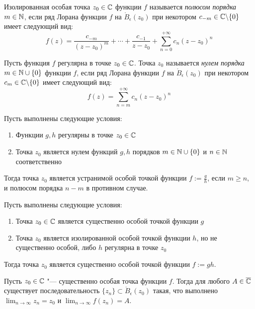 \begin{definition}
	Изолированная особая точка $z_0 \in \mathbb{C}$ функции $f$ называется \textit{полюсом порядка $m \in \mathbb{N}$}, если ряд Лорана функции $f$ на $\mathring B_\epsilon(z_0)$ при некотором $c_{-m} \in \mathbb{C} \backslash \{0\}$ имеет следующий вид:
	\[f(z) = \frac{c_{-m}}{(z-z_0)^m} + \dotsb + \frac{c_{-1}}{z-z_0} + \sum_{n = 0}^{+\infty}c_n(z - z_0)^n\]
\end{definition}

\begin{definition}
	Пусть функция $f$ регулярна в точке $z_0 \in \mathbb{C}$. Точка $z_0$ называется \textit{нулем порядка $m \in \mathbb{N} \cup \{0\}$} функции $f$, если ряд Лорана функции $f$ на $\mathring B_\epsilon(z_0)$ при некотором $c_{m} \in \mathbb{C} \backslash \{0\}$ имеет следующий вид:
	\[f(z) = \sum_{n = m}^{+\infty}c_n(z - z_0)^n\]
\end{definition}

\begin{proposition}
	Пусть выполнены следующие условия:
	\begin{enumerate}
		\item Функции $g, h$ регулярны в точке $z_0 \in \mathbb{C}$
		\item Точка $z_0$ является нулем функций $g, h$ порядков $m \in \mathbb{N} \cup \{0\}$ и $n \in \mathbb{N}$ соответственно
	\end{enumerate}
	
	Тогда точка $z_0$ является устранимой особой точкой функции $f := \frac{g}{h}$, если $m \ge n$, и полюсом порядка $n - m$ в противном случае.
\end{proposition}

\begin{proposition}
	Пусть выполнены следующие условия:
	\begin{enumerate}
		\item Точка $z_0 \in \mathbb{C}$ является существенно особой точкой функции $g$
		\item Точка $z_0$ является изолированной особой точкой функции $h$, но не существенно особой, либо $h$ регулярна в точке $z_0$ 
	\end{enumerate}
	
	Тогда точка $z_0$ является существенно особой точкой функции $f := gh$.
\end{proposition}

\begin{theorem}[Сохоцкого]
	Пусть $z_0 \in \mathbb{C}$ "--- существенно особая точка функции $f$. Тогда для любого $A \in \overline{\mathbb{C}}$ существует последовательность $\{z_n\} \subset \mathring B_\epsilon(z_0)$ такая, что выполнено $\lim_{n \to \infty}z_n = z_0$ и $\lim_{n \to \infty}f(z_n) = A$.
\end{theorem}

